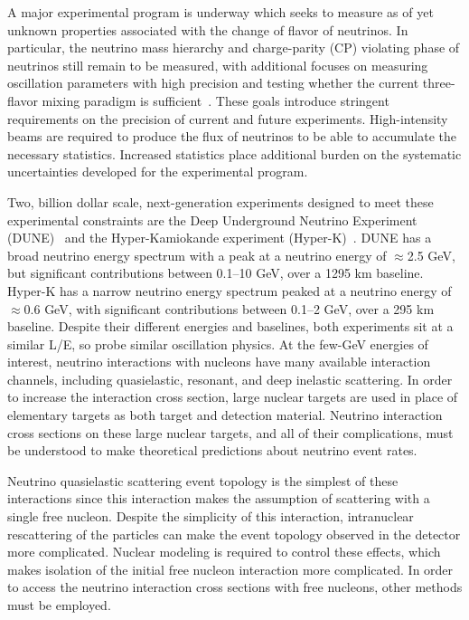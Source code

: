 
A major experimental program is underway which seeks to measure
as of yet unknown properties associated with the change of flavor of neutrinos.
In particular, the neutrino mass hierarchy and charge-parity (CP) violating phase
of neutrinos still remain to be measured, with additional focuses on measuring
oscillation parameters with high precision and testing whether the current
three-flavor mixing paradigm is sufficient~\cite{Esteban:2020cvm, ParticleDataGroup:2020ssz}.
These goals introduce stringent requirements on the precision of current and future experiments.
High-intensity beams are required to produce the flux of neutrinos
 to be able to accumulate the necessary statistics.
Increased statistics place additional burden on the systematic uncertainties developed for the experimental program.

Two, billion dollar scale, next-generation experiments designed to meet these experimental constraints
are the Deep Underground Neutrino Experiment (DUNE)~\cite{Abi:2020wmh}
 and the Hyper-Kamiokande experiment (Hyper-K)~\cite{Hyper-Kamiokande:2018ofw}.
DUNE has a broad neutrino energy spectrum with a peak at a neutrino energy of $\approx$2.5 GeV,
but significant contributions between 0.1--10 GeV, over a 1295 km baseline. Hyper-K has a narrow
neutrino energy spectrum peaked at a neutrino energy of $\approx$0.6 GeV, with significant
contributions between 0.1--2 GeV, over a 295 km baseline. Despite their different energies and
baselines, both experiments sit at a similar L/E, so probe similar oscillation physics.
At the few-GeV energies of interest, neutrino interactions with nucleons have many available interaction channels,
 including quasielastic, resonant, and deep inelastic scattering.
In order to increase the interaction cross section,
 large nuclear targets are used in place of elementary targets
 as both target and detection material.
Neutrino interaction cross sections on these large nuclear targets,
 and all of their complications,
 must be understood to make theoretical predictions about neutrino event rates.

Neutrino quasielastic scattering event topology is the simplest of these interactions
 since this interaction makes the assumption of scattering with a single free nucleon.
Despite the simplicity of this interaction,
 intranuclear rescattering of the particles can make the event topology observed
 in the detector more complicated.
Nuclear modeling is required to control these effects,
 which makes isolation of the initial free nucleon interaction more complicated.
In order to access the neutrino interaction cross sections with free nucleons,
 other methods must be employed.

